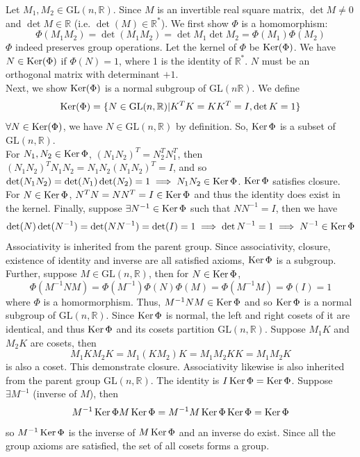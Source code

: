 \documentclass[a4paper]{article}
\begin{document}
\begin{ans}
Let $M_1,M_2\in\text{GL}(n,\mathbb{R})$. Since $M$ is an invertible real square matrix, $\det M\neq 0$ and $\det M\in\mathbb{R}$ (i.e. $\det(M)\in\mathbb{R}^*$). We first show $\Phi$ is a homomorphism:
$$\Phi(M_1M_2)=\det(M_1M_2)=\det M_1\det M_2=\Phi(M_1)\Phi(M_2)$$
$\Phi$ indeed preserves group operations. Let the kernel of $\Phi$ be $\operatorname{Ker}(\Phi)$. We have $N\in\operatorname{Ker}(\Phi)$ if $\Phi(N)=1$, where 1 is the identity of $\mathbb{R}^*$. $N$ must be an orthogonal matrix with determinant $+1$.\\[5pt]
Next, we show $\operatorname{Ker}(\Phi)$ is a normal subgroup of $\text{GL}(n\mathbb{R})$. We define 
$$\operatorname{Ker}(\Phi)=\{N\in\text{GL}(n,\mathbb{R})|K^TK=KK^T=I,\det K=1\}$$
$\forall N\in\operatorname{Ker}(\Phi)$, we have $N\in\text{GL}(n,\mathbb{R})$ by definition. So, $\operatorname{Ker}\Phi$ is a subset of $\text{GL}(n,\mathbb{R})$.\\[5pt]
For $N_1,N_2\in\operatorname{Ker}\Phi$, $(N_1N_2)^T=N_2^TN_1^T$, then $(N_1N_2)^TN_1N_2=N_1N_2(N_1N_2)^T=I$, and so $\det(N_1N_2)=\det(N_1)\det(N_2)=1\implies N_1N_2\in\operatorname{Ker}\Phi$. $\operatorname{Ker}\Phi$ satisfies closure.\\[5pt]
For $N\in\operatorname{Ker}\Phi$, $N^TN=NN^T=I\in\operatorname{Ker}\Phi$ and thus the identity does exist in the kernel. Finally, suppose $\exists N^{-1}\in\operatorname{Ker}\Phi$ such that $NN^{-1}=I$, then we have
$$\det(N)\det(N^{-1})=\det(NN^{-1})=\det(I)=1\implies\det N^{-1}=1\implies N^{-1}\in\operatorname{Ker}\Phi$$
Associativity is inherited from the parent group. Since associativity, closure, existence of identity and inverse are all satisfied axioms, $\operatorname{Ker}\Phi$ is a subgroup.\\[5pt]
Further, suppose $M\in\text{GL}(n,\mathbb{R})$, then for $N\in\operatorname{Ker}\Phi$,
$$\Phi(M^{-1}NM)=\Phi(M^{-1})\Phi(N)\Phi(M)=\Phi(M^{-1}M)=\Phi(I)=1$$
where $\Phi$ is a homormorphism. Thus, $M^{-1}NM\in\operatorname{Ker}\Phi$ and so $\operatorname{Ker}\Phi$ is a normal subgroup of $\text{GL}(n,\mathbb{R})$. Since $\operatorname{Ker}\Phi$ is normal, the left and right cosets of it are identical, and thus $\operatorname{Ker}\Phi$ and its cosets partition $\text{GL}(n,\mathbb{R})$. Suppose $M_1K$ and $M_2K$ are cosets, then 
$$M_1KM_2K=M_1(KM_2)K=M_1M_2KK=M_1M_2K$$
is also a coset. This demonstrate closure. Associativity likewise is also inherited from the parent group $\text{GL}(n,\mathbb{R})$. The identity is $I\operatorname{Ker}\Phi=\operatorname{Ker}\Phi$. Suppose $\exists M^{-1}$ (inverse of $M$), then
$$M^{-1}\operatorname{Ker}\Phi M\operatorname{Ker}\Phi=M^{-1}M\operatorname{Ker}\Phi\operatorname{Ker}\Phi=\operatorname{Ker}\Phi$$
so $M^{-1}\operatorname{Ker}\Phi$ is the inverse of $M\operatorname{Ker}\Phi$ and an inverse do exist. Since all the group axioms are satisfied, the set of all cosets forms a group.
\end{ans}
\end{document}
